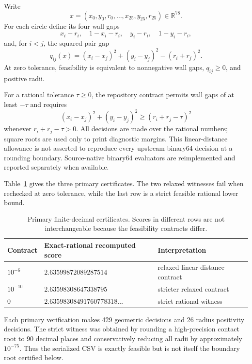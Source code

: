 \documentclass[11pt]{article}
\newcommand{\R}{\mathbb{R}}
\begin{document}
Write
\[
  x=(x_0,y_0,r_0,\ldots,x_{25},y_{25},r_{25})\in\R^{78}.
\]
For each circle define its four wall gaps
\[
  x_i-r_i,\quad 1-x_i-r_i,\quad y_i-r_i,\quad 1-y_i-r_i,
\]
and, for $i<j$, the squared pair gap
\begin{equation}
  q_{ij}(x)=(x_i-x_j)^2+(y_i-y_j)^2-(r_i+r_j)^2.             \label{eq:pairgap}
\end{equation}
At zero tolerance, feasibility is equivalent to nonnegative wall gaps,
$q_{ij}\geq0$, and positive radii.

For a rational tolerance $\tau\geq0$, the repository contract permits wall
gaps of at least $-\tau$ and requires
\begin{equation}
 (x_i-x_j)^2+(y_i-y_j)^2\geq(r_i+r_j-\tau)^2                 \label{eq:tolerance}
\end{equation}
whenever $r_i+r_j-\tau>0$.  All decisions are made over the rational numbers;
square roots are used only to print diagnostic margins.  This linear-distance
allowance is not asserted to reproduce every upstream binary64 decision at a
rounding boundary.  Source-native binary64 evaluators are reimplemented and
reported separately when available.

Table~\ref{tab:contracts} gives the three primary certificates.  The two
relaxed witnesses fail when rechecked at zero tolerance, while the last row is
a strict feasible rational lower bound.

\begin{table}[ht]
\centering
\caption{Primary finite-decimal certificates.  Scores in different rows are
not interchangeable because the feasibility contracts differ.}
\label{tab:contracts}
\begin{tabular}{@{}lll@{}}
\toprule
Contract & Exact-rational recomputed score & Interpretation \\
\midrule
$10^{-6}$  & $2.63599872089287514$ & relaxed linear-distance contract \\
$10^{-10}$ & $2.63598308647338795$ & stricter relaxed contract \\
$0$        & $2.63598308491760778318\ldots$ & strict rational witness \\
\bottomrule
\end{tabular}
\end{table}

Each primary verification makes 429 geometric decisions and 26 radius
positivity decisions.  The strict witness was obtained by rounding a
high-precision contact root to 90 decimal places and conservatively reducing
all radii by approximately $10^{-75}$.  Thus the serialized CSV is exactly
feasible but is not itself the boundary root certified below.
\end{document}
